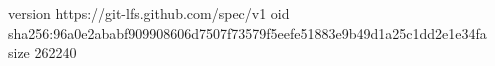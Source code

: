 version https://git-lfs.github.com/spec/v1
oid sha256:96a0e2ababf909908606d7507f73579f5eefe51883e9b49d1a25c1dd2e1e34fa
size 262240
